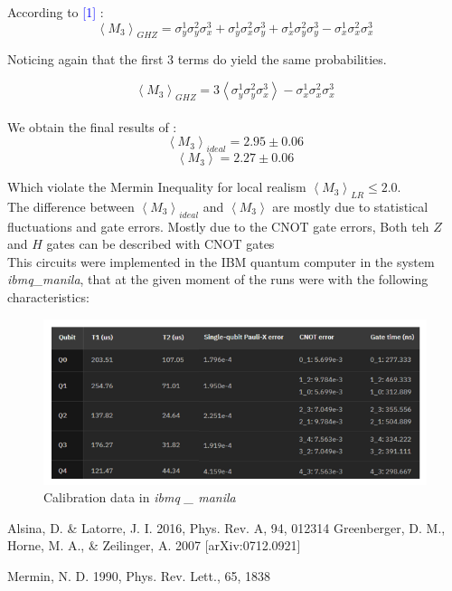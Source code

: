 \documentclass{article}
\begin{document}
 According to \textcolor{blue}{[1]}
:
\begin{equation*}
\left\langle M_{3}\right\rangle_{G H Z}=\sigma_{y}^{1} \sigma_{y}^{2} \sigma_{x}^{3}+\sigma_{y}^{1} \sigma_{x}^{2} \sigma_{y}^{3}+\sigma_{x}^{1} \sigma_{y}^{2} \sigma_{y}^{3}-\sigma_{x}^{1} \sigma_{x}^{2} \sigma_{x}^{3}
\end{equation*}

Noticing again that the first 3 terms do yield the same probabilities.

$$
\left\langle M_{3}\right\rangle_{G H Z}=3\left\langle\sigma_{y}^{1} \sigma_{y}^{2} \sigma_{x}^{3}\right\rangle-\sigma_{x}^{1} \sigma_{x}^{2} \sigma_{x}^{3}
$$\\

We obtain the final results of :
\begin{equation*}
    \left\langle M_{3}\right\rangle_{ideal}=2.95 \pm 0.06
\end{equation*}
\begin{equation*}
    \left\langle M_{3}\right\rangle=2.27 \pm 0.06
\end{equation*}


Which violate the Mermin Inequality for local realism $\left\langle M_{3}\right\rangle_{LR}\leq2.0$. \\
The difference between $\left\langle M_{3}\right\rangle_{ideal}$ and $ \left\langle M_{3}\right\rangle$ are mostly due to statistical fluctuations and 
gate errors. Mostly due to the CNOT gate errors, Both teh $\boxed{Z}$ and $\boxed{H}$ gates can be described with CNOT gates\\
This circuits were implemented in the IBM quantum computer in the system \emph{ibmq\_manila}, that at the given moment of the runs were with the following characteristics:


\begin{figure}[H]
    \centering
    \includegraphics[scale = 0.6]{errrrrr.png}
    \caption{Calibration data in \emph{ibmq \_ manila}}
\end{figure}





\begin{thebibliography}{10}
 Alsina, D. & Latorre, J. I. 2016, Phys. Rev. A, 94, 012314
 Greenberger, D. M., Horne, M. A., & Zeilinger, A. 2007 [arXiv:0712.0921]

Mermin, N. D. 1990, Phys. Rev. Lett., 65, 1838


\end{thebibliography}
\end{document}
